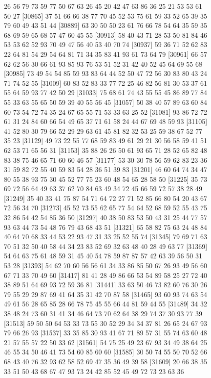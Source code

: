 \documentclass{article}
\begin{document}
\begin{figure}[H]
\begin{Schunk}
\begin{Soutput}
[30841] 26 56 79 73 59 77 50 67 63 26 45 20 42 47 63 86 36 25 21 53 53 61 50 27
[30865] 37 51 66 66 38 77 70 45 52 53 75 61 59 33 52 65 39 35 79 60 49 43 51 44
[30889] 63 30 50 50 23 61 76 66 78 54 64 35 59 35 68 69 59 65 68 57 47 60 45 55
[30913] 58 40 43 71 28 53 50 81 84 46 53 53 62 52 93 70 49 47 56 40 53 40 70 74
[30937] 59 36 71 52 62 83 22 64 81 54 29 54 64 81 71 34 35 83 41 93 61 73 64 79
[30961] 66 57 62 62 56 30 66 61 93 85 93 76 53 51 52 31 42 40 52 45 64 69 55 68
[30985] 73 49 54 54 85 59 93 83 64 44 52 50 47 72 56 30 83 80 43 24 71 74 52 55
[31009] 60 83 52 83 33 77 72 25 46 82 56 81 30 53 37 61 55 64 59 93 77 42 50 29
[31033] 75 68 61 74 43 55 55 45 86 89 77 84 55 33 63 55 65 50 59 39 40 55 56 45
[31057] 50 38 40 57 89 63 60 84 60 73 54 72 74 35 24 67 65 55 71 53 33 63 25 52
[31081] 93 86 72 72 61 31 24 84 60 66 54 49 65 37 71 61 58 24 44 67 69 48 59 93
[31105] 41 52 80 30 79 66 52 29 29 63 61 45 81 82 32 53 25 59 38 67 52 77 35 23
[31129] 49 73 22 55 77 68 59 83 49 61 29 21 30 56 58 59 41 51 62 53 71 65 56 31
[31153] 35 88 26 26 50 61 93 65 71 28 52 65 82 48 83 38 75 46 65 71 60 60 46 57
[31177] 53 30 30 78 56 59 62 83 23 36 31 59 82 72 55 40 59 83 54 28 36 51 39 83
[31201] 46 60 64 74 34 47 80 55 38 93 75 30 45 52 77 75 23 60 48 54 65 28 58 50
[31225] 35 73 69 72 56 64 49 63 37 62 70 84 63 49 34 72 45 66 59 72 57 38 28 49
[31249] 35 40 33 41 75 87 54 71 64 72 27 71 52 85 66 80 54 20 43 67 72 56 34 70
[31273] 45 52 73 55 62 65 77 54 64 52 68 59 52 55 43 75 32 86 54 42 54 85 36 50
[31297] 40 38 50 83 53 50 43 31 25 44 77 57 93 63 44 73 54 48 76 79 43 68 43 51
[31321] 65 58 82 75 63 24 48 84 40 64 70 68 33 44 53 22 93 47 31 33 25 52 55 74
[31345] 79 69 71 63 70 51 32 50 40 58 44 34 23 83 52 69 32 63 48 40 28 49 63 77
[31369] 54 64 63 75 61 48 59 31 45 40 54 78 59 87 87 57 42 63 39 56 50 31 53 28
[31393] 54 62 70 60 56 56 61 34 33 86 85 50 67 26 93 49 56 60 67 71 33 70 49 60
[31417] 81 41 28 49 86 66 53 54 89 58 25 27 72 40 38 89 51 64 69 93 72 59 36 81
[31441] 33 63 50 46 73 82 60 76 30 26 79 55 29 29 87 69 41 64 35 31 42 70 87 58
[31465] 93 60 93 74 63 54 49 61 56 28 65 85 28 66 78 75 45 55 66 44 81 59 44 55
[31489] 34 32 38 48 24 73 60 31 41 34 46 64 73 70 62 64 38 29 74 37 30 93 77 39
[31513] 59 50 50 64 53 33 73 55 30 52 29 34 34 37 81 26 65 24 67 93 79 66 26 93
[31537] 33 35 85 30 93 41 67 71 89 57 31 55 74 63 60 48 21 57 55 57 22 50 33 62
[31561] 54 75 25 49 23 67 93 34 49 38 64 25 46 55 34 50 46 41 73 54 60 85 60 60
[31585] 30 50 74 55 50 70 52 66 68 43 40 76 32 93 62 58 52 69 47 35 36 49 39 58
[31609] 20 66 38 35 33 51 50 43 68 67 47 93 73 24 42 85 52 45 49 72 73 23 63 36

\end{Soutput}
\end{Schunk}
\end{figure}
\end{document}
